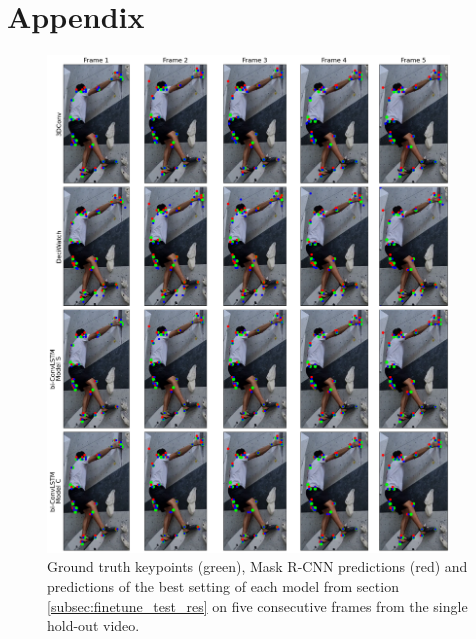 \documentclass[./main.tex]{subfiles}
\begin{document}
\section*{Appendix}

\begin{figure}[h!]
    \centering
    \includegraphics[width=0.95\textwidth]{./entities/predictions.png}
    \caption{Ground truth keypoints (green), Mask R-CNN predictions (red) and predictions of the best setting of each model from section \ref{subsec:finetune_test_res} on five consecutive frames from the single hold-out video.}
    \label{fig:predictions}
\end{figure}
\end{document}
